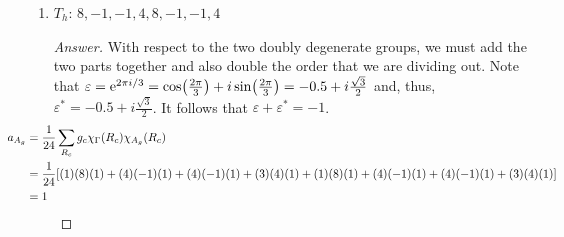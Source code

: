 \documentclass[../psets.tex]{subfiles}
\begin{document}
\begin{enumerate}[label={\Roman*)}]
\begin{enumerate}[label={\alph*)}]
\begin{proof}[Answer]
            \begin{align*}
                \hspace{-3em}a_{A_1} &= \frac{1}{24}\sum_{R_c}g_c\chi_\Gamma(R_c)\chi_{A_1}(R_c) = \frac{1}{24}[(1)(13)(1)+(8)(1)(1)+(3)(5)(1)+(6)(-3)(1)+(6)(-3)(1)] = 0\\
                \hspace{-3em}a_{A_2} &= \frac{1}{24}\sum_{R_c}g_c\chi_\Gamma(R_c)\chi_{A_2}(R_c) = \frac{1}{24}[(1)(13)(1)+(8)(1)(1)+(3)(5)(1)+(6)(-3)(-1)+(6)(-3)(-1)] = 3\\
                \hspace{-3em}a_{E}   &= \frac{1}{24}\sum_{R_c}g_c\chi_\Gamma(R_c)\chi_{E}(R_c)   = \frac{1}{24}[(1)(13)(2)+(8)(1)(-1)+(3)(5)(2)+(6)(-3)(0)+(6)(-3)(0)] = 2\\
                \hspace{-3em}a_{T_1} &= \frac{1}{24}\sum_{R_c}g_c\chi_\Gamma(R_c)\chi_{T_1}(R_c) = \frac{1}{24}[(1)(13)(3)+(8)(1)(0)+(3)(5)(-1)+(6)(-3)(1)+(6)(-3)(-1)] = 1\\
                \hspace{-3em}a_{T_2} &= \frac{1}{24}\sum_{R_c}g_c\chi_\Gamma(R_c)\chi_{T_2}(R_c) = \frac{1}{24}[(1)(13)(3)+(8)(1)(0)+(3)(5)(-1)+(6)(-3)(-1)+(6)(-3)(1)] = 1
            \end{align*}
            Therefore, we know that
            \begin{equation*}
                \Gamma = 3A_2+2E+T_1+T_2
            \end{equation*}
        \end{proof}
        \item $T_h$: $8,-1,-1,4,8,-1,-1,4$
        \begin{proof}[Answer]
            With respect to the two doubly degenerate groups, we must add the two parts together and also double the order that we are dividing out. Note that $\varepsilon=\e[2\pi i/3]=\cos(\frac{2\pi}{3})+i\sin(\frac{2\pi}{3})=-0.5+i\frac{\sqrt{3}}{2}$ and, thus, $\varepsilon^*=-0.5+i\frac{\sqrt{3}}{2}$. It follows that $\varepsilon+\varepsilon^*=-1$.
            \begin{align*}
                \hspace{-4em}a_{A_g} &= \frac{1}{24}\sum_{R_c}g_c\chi_\Gamma(R_c)\chi_{A_g}(R_c)\\
                \hspace{-4em}&= \frac{1}{24}[(1)(8)(1)+(4)(-1)(1)+(4)(-1)(1)+(3)(4)(1)+(1)(8)(1)+(4)(-1)(1)+(4)(-1)(1)+(3)(4)(1)]\\
                \hspace{-4em}&= 1

\end{align*}
\end{proof}
\end{enumerate}
\end{enumerate}
\end{document}

